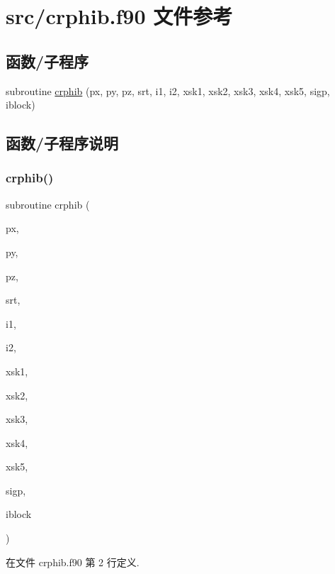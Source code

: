 \hypertarget{crphib_8f90}{}\section{src/crphib.f90 文件参考}
\label{crphib_8f90}
\subsection*{函数/子程序}
\begin{DoxyCompactItemize}
\item 
subroutine \mbox{\hyperlink{crphib_8f90_ae72ee953c6d9377dc619b2fad7972fb4}{crphib}} (px, py, pz, srt, i1, i2, xsk1, xsk2, xsk3, xsk4, xsk5, sigp, iblock)
\end{DoxyCompactItemize}


\subsection{函数/子程序说明}
\mbox{\label{crphib_8f90_ae72ee953c6d9377dc619b2fad7972fb4}} 
\subsubsection{\texorpdfstring{crphib()}{crphib()}}
{\footnotesize\ttfamily subroutine crphib (\begin{DoxyParamCaption}\item[{}]{px,  }\item[{}]{py,  }\item[{}]{pz,  }\item[{}]{srt,  }\item[{}]{i1,  }\item[{}]{i2,  }\item[{}]{xsk1,  }\item[{}]{xsk2,  }\item[{}]{xsk3,  }\item[{}]{xsk4,  }\item[{}]{xsk5,  }\item[{}]{sigp,  }\item[{}]{iblock }\end{DoxyParamCaption})}



在文件 crphib.\+f90 第 2 行定义.

